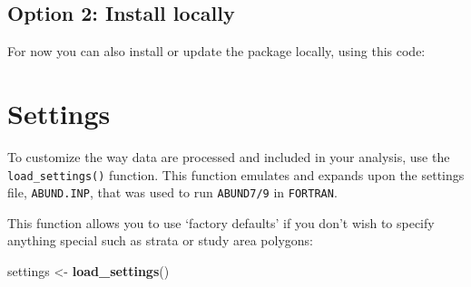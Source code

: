 \documentclass[
]{book}
\newenvironment{Shaded}{\begin{snugshade}}{\end{snugshade}}
\newcommand{\CommentTok}[1]{\textcolor[rgb]{0.56,0.35,0.01}{\textit{#1}}}
\newcommand{\ControlFlowTok}[1]{\textcolor[rgb]{0.13,0.29,0.53}{\textbf{#1}}}
\newcommand{\KeywordTok}[1]{\textcolor[rgb]{0.13,0.29,0.53}{\textbf{#1}}}
\newcommand{\NormalTok}[1]{#1}
\newcommand{\OperatorTok}[1]{\textcolor[rgb]{0.81,0.36,0.00}{\textbf{#1}}}
\newcommand{\StringTok}[1]{\textcolor[rgb]{0.31,0.60,0.02}{#1}}
\begin{document}
\hypertarget{option-2-install-locally}{%
\section*{Option 2: Install locally}\label{option-2-install-locally}}

For now you can also install or update the package locally, using this code:

\begin{Shaded}
\end{Shaded}

\hypertarget{settings}{%
\chapter{Settings}\label{settings}}

To customize the way data are processed and included in your analysis, use the \texttt{load\_settings()} function. This function emulates and expands upon the settings file, \texttt{ABUND.INP}, that was used to run \texttt{ABUND7/9} in \texttt{FORTRAN}.

This function allows you to use `factory defaults' if you don't wish to specify anything special such as strata or study area polygons:

\begin{Shaded}
\begin{Highlighting}[]
\NormalTok{settings <-}\StringTok{ }\KeywordTok{load_settings}\NormalTok{()}
\end{Highlighting}
\end{Shaded}
\end{document}

